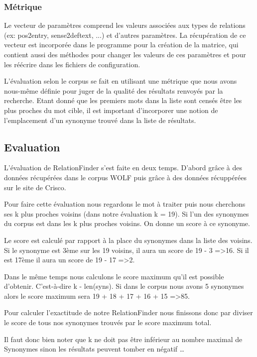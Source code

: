 \subsubsection{Métrique}

Le vecteur de paramètres comprend les valeurs associées aux types de relations 
(ex: pos2entry, sense2deftext, ...) et d'autres paramètres. La récupération de 
ce vecteur est incorporée dans le programme 
pour la création de la matrice, qui contient aussi des méthodes pour changer 
les valeurs de ces paramètres et pour les réécrire dans les fichiers de 
configuration.

L'évaluation selon le corpus se fait en utilisant une métrique que nous 
avons nous-même définie pour juger de la qualité des résultats renvoyés par la 
recherche. Etant donné que les premiers mots dans la liste sont censés être les 
plus proches du mot cible, il est important d'incorporer une notion de 
l'emplacement d'un synonyme trouvé dans la liste de résultats.


\subsection{Evaluation}

L'évaluation de RelationFinder s'est faite en deux temps. D'abord grâce à des 
données récupérées dans le corpus WOLF puis grâce à des données récuppérées sur 
le site de Crisco.

Pour faire cette évaluation nous regardons le mot à traiter puis nous cherchons 
ses k plus proches voisins (dans notre évaluation k = 19). Si l'un des 
synonymes du corpus est dans les k plus proches voisins. On donne un score à ce 
synonyme.

Le score est calculé par rapport à la place du synonymes dans la liste des 
voisins. Si le synonyme est 3ème sur les 19 voisins, il aura un score de 19 - 3 
=\textgreater 16. Si il est 17ème il aura un score de 19 - 17 =\textgreater 2.

Dans le même temps nous calculons le score maximum qu'il est possible 
d'obtenir. C'est-à-dire k - len(syns). Si dans le corpus nous avons 5 synonymes 
alors le score maximum sera 19 + 18 + 17 + 16 + 15 =\textgreater 85.

Pour calculer l'exactitude de notre RelationFinder nous finissons donc par 
diviser le score de tous nos synonymes trouvés par le score maximum total.

Il faut donc bien noter que k ne doit pas être inférieur au nombre maximal de 
Synonymes sinon les résultats peuvent tomber en négatif \dots


